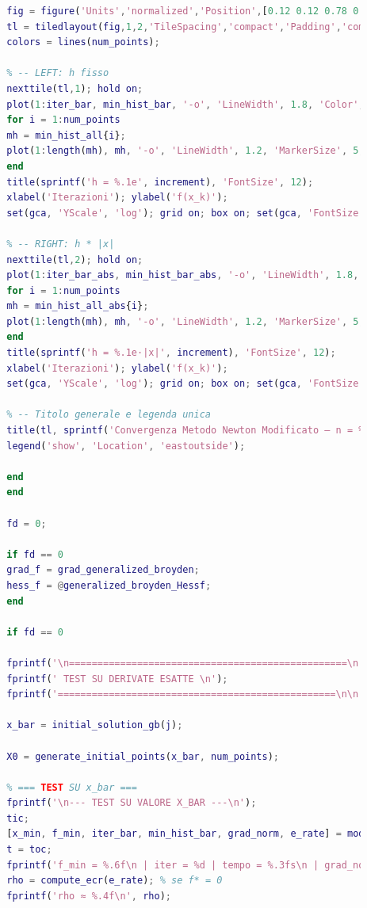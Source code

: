 \documentclass[a4paper,12pt]{article}
\begin{document}
\begin{lstlisting}[language=Matlab,caption={Full script: Modified Newton method on Generalyzed Broyden},label={lst:broyden}]
		% === FIGURE ===
		fig = figure('Units','normalized','Position',[0.12 0.12 0.78 0.62]);
		tl = tiledlayout(fig,1,2,'TileSpacing','compact','Padding','compact');
		colors = lines(num_points);
		
		% -- LEFT: h fisso
		nexttile(tl,1); hold on;
		plot(1:iter_bar, min_hist_bar, '-o', 'LineWidth', 1.8, 'Color', 'k', 'DisplayName', 'x̄');
		for i = 1:num_points
		mh = min_hist_all{i};
		plot(1:length(mh), mh, '-o', 'LineWidth', 1.2, 'MarkerSize', 5, 'Color', colors(i,:), 'DisplayName', sprintf('x₀ #%d', i));
		end
		title(sprintf('h = %.1e', increment), 'FontSize', 12);
		xlabel('Iterazioni'); ylabel('f(x_k)');
		set(gca, 'YScale', 'log'); grid on; box on; set(gca, 'FontSize', 11);
		
		% -- RIGHT: h * |x|
		nexttile(tl,2); hold on;
		plot(1:iter_bar_abs, min_hist_bar_abs, '-o', 'LineWidth', 1.8, 'Color', 'k', 'DisplayName', 'x̄');
		for i = 1:num_points
		mh = min_hist_all_abs{i};
		plot(1:length(mh), mh, '-o', 'LineWidth', 1.2, 'MarkerSize', 5, 'Color', colors(i,:), 'DisplayName', sprintf('x₀ #%d', i));
		end
		title(sprintf('h = %.1e·|x|', increment), 'FontSize', 12);
		xlabel('Iterazioni'); ylabel('f(x_k)');
		set(gca, 'YScale', 'log'); grid on; box on; set(gca, 'FontSize', 11);
		
		% -- Titolo generale e legenda unica
		title(tl, sprintf('Convergenza Metodo Newton Modificato – n = %d', j), 'FontSize', 14);
		legend('show', 'Location', 'eastoutside');
		
		end
		end
		
		fd = 0;
		
		if fd == 0
		grad_f = grad_generalized_broyden;
		hess_f = @generalized_broyden_Hessf;
		end
		
		if fd == 0
		
		fprintf('\n=================================================\n');
		fprintf(' TEST SU DERIVATE ESATTE \n');
		fprintf('=================================================\n\n');
		
		x_bar = initial_solution_gb(j);
		
		X0 = generate_initial_points(x_bar, num_points);
		
		% === TEST SU x_bar ===
		fprintf('\n--- TEST SU VALORE X_BAR ---\n');
		tic;
		[x_min, f_min, iter_bar, min_hist_bar, grad_norm, e_rate] = modified_newton(generalized_broyden,grad_f,hess_f,x_bar,tol,max_iter,fd,[],[]);
		t = toc;
		fprintf('f_min = %.6f\n | iter = %d | tempo = %.3fs\n | grad_norm = %.6f\n', f_min, iter_bar, t,grad_norm);
		rho = compute_ecr(e_rate); % se f* = 0
		fprintf('rho ≈ %.4f\n', rho);
		

\end{lstlisting}
\end{document}

